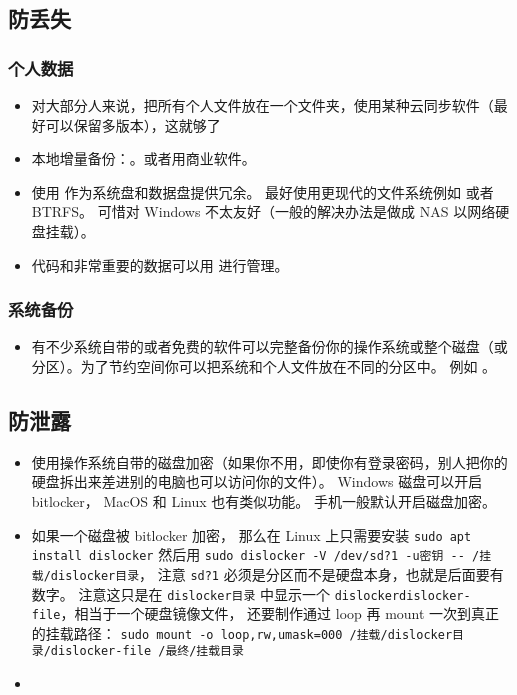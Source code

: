 
\begin{issues}
\issueDraft
\end{issues}

\subsection{防丢失}
\subsubsection{个人数据}
\begin{itemize}
\item 对大部分人来说，把所有个人文件放在一个文件夹，使用某种云同步软件（最好可以保留多版本），这就够了
\item 本地增量备份：。或者用商业软件。
\item 使用  作为系统盘和数据盘提供冗余。 最好使用更现代的文件系统例如  或者 BTRFS。 可惜对 Windows 不太友好（一般的解决办法是做成 NAS 以网络硬盘挂载）。
\item 代码和非常重要的数据可以用   进行管理。
\end{itemize}

\subsubsection{系统备份}
\begin{itemize}
\item 有不少系统自带的或者免费的软件可以完整备份你的操作系统或整个磁盘（或分区）。为了节约空间你可以把系统和个人文件放在不同的分区中。 例如 。
\end{itemize}

\subsection{防泄露}
\begin{itemize}
\item 使用操作系统自带的磁盘加密（如果你不用，即使你有登录密码，别人把你的硬盘拆出来差进别的电脑也可以访问你的文件）。 Windows 磁盘可以开启 bitlocker， MacOS 和 Linux 也有类似功能。 手机一般默认开启磁盘加密。
\item 如果一个磁盘被 bitlocker 加密， 那么在 Linux 上只需要安装 \verb`sudo apt install dislocker` 然后用 \verb`sudo dislocker -V /dev/sd?1 -u密钥 -- /挂载/dislocker目录`， 注意 \verb`sd?1` 必须是分区而不是硬盘本身，也就是后面要有数字。  注意这只是在 \verb`dislocker目录` 中显示一个 \verb`dislockerdislocker-file`，相当于一个硬盘镜像文件， 还要制作通过 loop 再 mount 一次到真正的挂载路径： \verb`sudo mount -o loop,rw,umask=000 /挂载/dislocker目录/dislocker-file /最终/挂载目录`
\item {}
\end{itemize}
